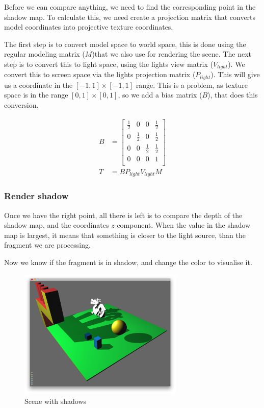 Before we can compare anything, we need to find the corresponding
point in the shadow map. To calculate this, we need create a
projection matrix that converts model coordinates into projective
texture coordinates.

The first step is to convert model space to world space, this is done
using the regular modeling matrix ($M$)that we also use for rendering
the scene. The next step is to convert this to light space, using the
lights view matrix ($V_{light}$). We convert this to screen space via
the lights projection matrix ($P_{light}$). This will give us a
coordinate in the $[-1,1] \times [-1,1]$ range. This is a problem, as
texture space is in the range $[0,1] \times [0,1]$, so we add a bias
matrix ($B$), that does this conversion.

\begin{align*}
  B &= \begin{bmatrix}
    \frac{1}{2} & 0   & 0   & \frac{1}{2} \\
    0   & \frac{1}{2} & 0   & \frac{1}{2} \\
    0   & 0   & \frac{1}{2} & \frac{1}{2} \\
    0   & 0   & 0   & 1   \\
  \end{bmatrix} \\
  T &= BP_{light}V_{light}M
\end{align*}

\subsubsection*{Render shadow}

Once we have the right point, all there is left is to compare the
depth of the shadow map, and the coordinates $z$-component. When the
value in the shadow map is largest, it means that something is closer
to the light source, than the fragment we are processing.


Now we know if the fragment is in shadow, and change the color
to visualise it.

\begin{figure}[h]
  \centering
  \includegraphics[width=0.7\textwidth]{gfx/scenewithshadow}  
  \caption{Scene with shadows}
  \label{fig:sceneshadow}
\end{figure}

